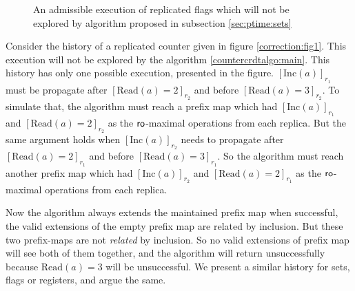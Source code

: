 \begin{figure}
\begin{minipage}{\textwidth}
        \caption{An admissible execution of replicated flags which will not be explored by algorithm proposed in subsection \ref{sec:ptime:sets}}
        \label{correction:fig2}
    \end{minipage}
    \end{figure}

Consider the history of a replicated counter given in figure \ref{correction:fig1}. This execution will not be explored by the algorithm \ref{countercrdtalgo:main}. This history has only one possible execution, presented in the figure. $[\mathrm{Inc}(a)]_{r_1}$ must be propagate after $[\mathrm{Read}(a) = 2]_{r_2}$ and before $[\mathrm{Read}(a) = 3]_{r_2}$. To simulate that, the algorithm must reach a prefix map which had $[\mathrm{Inc}(a)]_{r_1}$ and $[\mathrm{Read}(a) = 2]_{r_2}$ as the $\mathsf{ro}$-maximal operations from each replica. But the same argument holds when $[\mathrm{Inc}(a)]_{r_2}$ needs to propagate after $[\mathrm{Read}(a) = 2]_{r_1}$ and before $[\mathrm{Read}(a) = 3]_{r_1}$. So the algorithm must reach another prefix map which had $[\mathrm{Inc}(a)]_{r_2}$ and $[\mathrm{Read}(a) = 2]_{r_1}$ as the $\mathsf{ro}$-maximal operations from each replica.

Now the algorithm always extends the maintained prefix map \ie when successful, the valid extensions of the empty prefix map are related by inclusion. But these two prefix-maps are not \emph{related} by inclusion. So no valid extensions of prefix map will see both of them together, and the algorithm will return unsuccessfully because $\mathrm{Read}(a) = 3$ will be unsuccessful. We present a similar history for sets, flags or registers, and argue the same.

